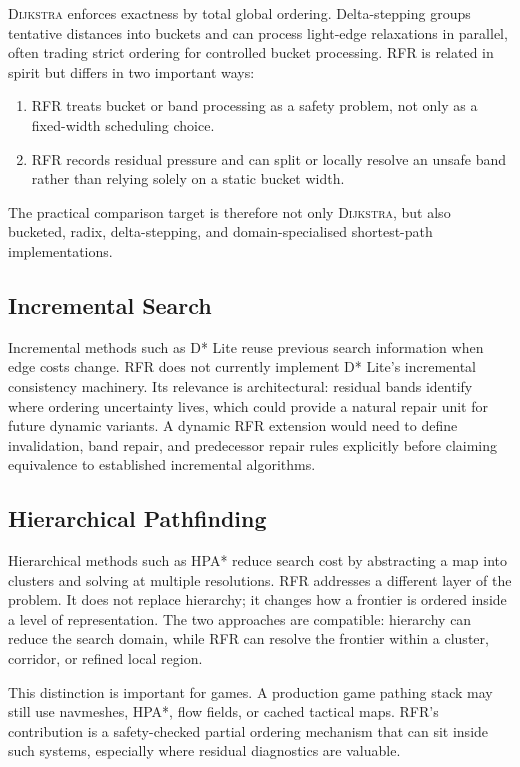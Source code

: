 \documentclass[11pt]{article}
\newcommand{\RFR}{\textsc{RFR}}
\newcommand{\Dijkstra}{\textsc{Dijkstra}}
\begin{document}
\Dijkstra{} enforces exactness by total global ordering. Delta-stepping groups tentative distances into buckets and can process light-edge relaxations in parallel, often trading strict ordering for controlled bucket processing. \RFR{} is related in spirit but differs in two important ways:

\begin{enumerate}
  \item \RFR{} treats bucket or band processing as a safety problem, not only as a fixed-width scheduling choice.
  \item \RFR{} records residual pressure and can split or locally resolve an unsafe band rather than relying solely on a static bucket width.
\end{enumerate}

The practical comparison target is therefore not only \Dijkstra{}, but also bucketed, radix, delta-stepping, and domain-specialised shortest-path implementations.

\subsection{Incremental Search}

Incremental methods such as D* Lite reuse previous search information when edge costs change. \RFR{} does not currently implement D* Lite's incremental consistency machinery. Its relevance is architectural: residual bands identify where ordering uncertainty lives, which could provide a natural repair unit for future dynamic variants. A dynamic \RFR{} extension would need to define invalidation, band repair, and predecessor repair rules explicitly before claiming equivalence to established incremental algorithms.

\subsection{Hierarchical Pathfinding}

Hierarchical methods such as HPA* reduce search cost by abstracting a map into clusters and solving at multiple resolutions. \RFR{} addresses a different layer of the problem. It does not replace hierarchy; it changes how a frontier is ordered inside a level of representation. The two approaches are compatible: hierarchy can reduce the search domain, while \RFR{} can resolve the frontier within a cluster, corridor, or refined local region.

This distinction is important for games. A production game pathing stack may still use navmeshes, HPA*, flow fields, or cached tactical maps. \RFR{}'s contribution is a safety-checked partial ordering mechanism that can sit inside such systems, especially where residual diagnostics are valuable.
\end{document}
